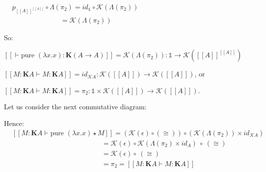 \documentclass[a4paper]{article}
\begin{document}
$\begin{array}{lll}
&p_{[\![A]\!]^{[\![A]\!]}} \circ \Lambda(\pi_2) = id_{\mathds{1}} \circ \mathcal{K}(\Lambda(\pi_2)) & \\
&\quad\quad\quad\quad\quad\quad\quad= \mathcal{K}(\Lambda(\pi_2))&
\end{array}$

So:

$[\![\vdash \text{pure } (\lambda x. x) : \textbf{K}(A \to A)]\!] = \mathcal{K}(\Lambda(\pi_2)) :
\mathds{1} \to \mathcal{K}([\![A]\!]^{[\![A]\!]})$

$[\![M : \textbf{K}A \vdash M : \textbf{K}A]\!] = id_{\mathcal{K}A} : \mathcal{K}([\![A]\!]) \to
\mathcal{K}([\![A]\!])$, or

$[\![M : \textbf{K}A \vdash M : \textbf{K}A]\!] = \pi_2 : \mathds{1} \times \mathcal{K}([\![A]\!]) \to \mathcal{K}([\![A]\!])$.

\vspace{\baselineskip}

Let us consider the next commutative diagram:


\vspace{\baselineskip}

Hence:\\
$\begin{array}{lll}
&[\![M : \textbf{K}A \vdash \text{pure } (\lambda x. x) \star M]\!] = (\mathcal{K}(\epsilon) \circ (\cong))
\circ (\mathcal{K}(\Lambda(\pi_2)) \times
id_{\mathcal{K}A}) & \\
&\quad\quad\quad\quad\quad\quad\quad\quad\quad\quad\quad\quad\quad = \mathcal{K}(\epsilon) \circ \mathcal{K}(\Lambda(\pi_2) \times id_A) \: \circ \: (\cong) & \\
&\quad\quad\quad\quad\quad\quad\quad\quad\quad\quad\quad\quad\quad = \mathcal{K}(\epsilon) \circ \: (\cong)& \\
&\quad\quad\quad\quad\quad\quad\quad\quad\quad\quad\quad\quad\quad = \pi_2 = [\![M : \textbf{K}A \vdash M : \textbf{K}A]\!]&
\end{array}$
\end{document}
